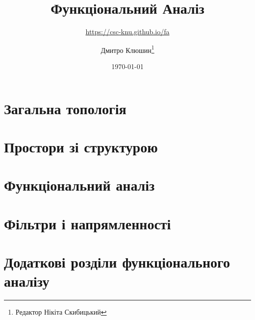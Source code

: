 \documentclass[a4paper,11pt,twoside=semi,openright,numbers=noenddot]{scrbook}
\title{Функціональний Аналіз}
\subtitle{\url{https://csc-knu.github.io/fa}}
\author{Дмитро Клюшин\thanks{Редактор Нікіта Скибицький}}
\date{\today}
\begin{document}
\frontmatter

\maketitle

\thispagestyle{empty}





\tableofcontents

\mainmatter

\part{Загальна топологія}
\parttoc






\part{Простори зі структурою}
\parttoc






\part{Функціональний аналіз}
\parttoc








\part{Фільтри і напрямленності}
\parttoc






\part{Додаткові розділи функціонального аналізу}
\parttoc
\end{document}
